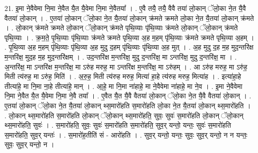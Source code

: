 \documentclass[17pt]{extarticle}
\begin{document}
21. इ॒मा ने॒वैवेमा नि॒मा ने॒वैत यै॒त यै॒वेमा नि॒मा ने॒वैतया᳚ । . ए॒वै तयै॒ तयै॒ वैवै तया॑ लो॒कान् ॅलो॒का ने॒त यै॒वै वैतया॑ लो॒कान् । . ए॒तया॑ लो॒कान् ॅलो॒का ने॒त यै॒तया॑ लो॒कान् क्र॑मते क्रमते लो॒का ने॒त यै॒तया॑ लो॒कान् क्र॑मते । . लो॒कान् क्र॑मते क्रमते लो॒कान् ॅलो॒कान् क्र॑मते पृथि॒व्याः पृ॑थि॒व्याः क्र॑मते लो॒कान् ॅलो॒कान् क्र॑मते पृथि॒व्याः । . क्र॒म॒ते॒ पृ॒थि॒व्याः पृ॑थि॒व्याः क्र॑मते क्रमते पृथि॒व्या अ॒ह म॒हम् पृ॑थि॒व्याः क्र॑मते क्रमते पृथि॒व्या अ॒हम् । . पृ॒थि॒व्या अ॒ह म॒हम् पृ॑थि॒व्याः पृ॑थि॒व्या अ॒ह मुदु द॒हम् पृ॑थि॒व्याः पृ॑थि॒व्या अ॒ह मुत् । . अ॒ह मुदु द॒ह म॒ह मुद॒न्तरि॑क्ष म॒न्तरि॑क्ष॒ मुद॒ह म॒ह मुद॒न्तरि॑क्षम् । . उद॒न्तरि॑क्ष म॒न्तरि॑क्ष॒ मुदु द॒न्तरि॑क्ष॒ मा ऽन्तरि॑क्ष॒ मुदु द॒न्तरि॑क्ष॒ मा । . अ॒न्तरि॑क्ष॒ मा ऽन्तरि॑क्ष म॒न्तरि॑क्ष॒ मा ऽरु॑ह मरुह॒ मा ऽन्तरि॑क्ष म॒न्तरि॑क्ष॒ मा ऽरु॑हम् । . आ ऽरु॑ह मरुह॒ मा ऽरु॑ह॒ मिती त्य॑रुह॒ मा ऽरु॑ह॒ मिति॑ । . अ॒रु॒ह॒ मिती त्य॑रुह मरुह॒ मित्या॑ हा॒हे त्य॑रुह मरुह॒ मित्या॑ह । . इत्या॑हा॒हे तीत्या॑हे॒ मा नि॒मा ना॒हे तीत्या॑हे॒ मान् । . आ॒हे॒ मा नि॒मा ना॑हाहे॒ मा ने॒वैवेमा ना॑हाहे॒ मा ने॒व । . इ॒मा ने॒वैवेमा नि॒मा ने॒वैत यै॒त यै॒वेमा नि॒मा ने॒वै तया᳚ । . ए॒वैत यै॒त यै॒वै वैतया॑ लो॒कान् ॅलो॒का ने॒त यै॒वै वैतया॑ लो॒कान् । . ए॒तया॑ लो॒कान् ॅलो॒का ने॒त यै॒तया॑ लो॒कान् थ्स॒मारो॑हति स॒मारो॑हति लो॒का ने॒त यै॒तया॑ लो॒कान् थ्स॒मारो॑हति । . लो॒कान् थ्स॒मारो॑हति स॒मारो॑हति लो॒कान् ॅलो॒कान् थ्स॒मारो॑हति॒ सुवः॒ सुवः॑ स॒मारो॑हति लो॒कान् ॅलो॒कान् थ्स॒मारो॑हति॒ सुवः॑ । . स॒मारो॑हति॒ सुवः॒ सुवः॑ स॒मारो॑हति स॒मारो॑हति॒ सुव॒र् यन्तो॒ यन्तः॒ सुवः॑ स॒मारो॑हति स॒मारो॑हति॒ सुव॒र् यन्तः॑ । . स॒मारो॑ह॒तीति॑ सं - आरो॑हति । . सुव॒र् यन्तो॒ यन्तः॒ सुवः॒ सुव॒र् यन्तो॒ न न यन्तः॒ सुवः॒ सुव॒र् यन्तो॒ न । \newline
\end{document}
